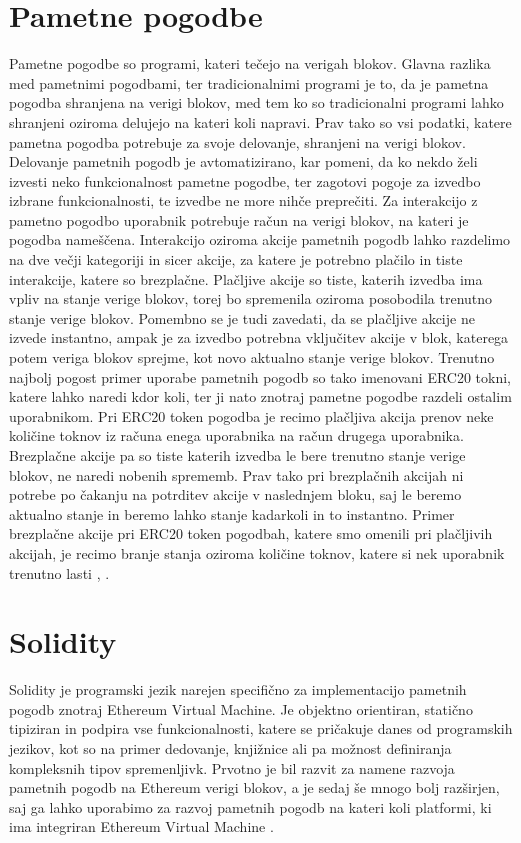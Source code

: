 \documentclass[a4paper,12pt,openright]{book}
\begin{document}
\section{Pametne pogodbe}
Pametne pogodbe so programi, kateri tečejo na verigah blokov.
Glavna razlika med pametnimi pogodbami, ter tradicionalnimi programi je to, da je pametna pogodba shranjena na verigi blokov, med tem ko so tradicionalni programi lahko shranjeni oziroma delujejo na kateri koli napravi.
Prav tako so vsi podatki, katere pametna pogodba potrebuje za svoje delovanje, shranjeni na verigi blokov.
Delovanje pametnih pogodb je avtomatizirano, kar pomeni, da ko nekdo želi izvesti neko funkcionalnost pametne pogodbe, ter zagotovi pogoje za izvedbo izbrane funkcionalnosti, te izvedbe ne more nihče preprečiti.
Za interakcijo z pametno pogodbo uporabnik potrebuje račun na verigi blokov, na kateri je pogodba nameščena.
Interakcijo oziroma akcije pametnih pogodb lahko razdelimo na dve večji kategoriji in sicer akcije, za katere je potrebno plačilo in tiste interakcije, katere so brezplačne.
Plačljive akcije so tiste, katerih izvedba ima vpliv na stanje verige blokov, torej bo spremenila oziroma posobodila trenutno stanje verige blokov.
Pomembno se je tudi zavedati, da se plačljive akcije ne izvede instantno, ampak je za izvedbo potrebna vključitev akcije v blok, katerega potem veriga blokov sprejme, kot novo aktualno stanje verige blokov.
Trenutno najbolj pogost primer uporabe pametnih pogodb so tako imenovani ERC20 tokni, katere lahko naredi kdor koli, ter ji nato znotraj pametne pogodbe razdeli ostalim uporabnikom. Pri ERC20 token pogodba je recimo plačljiva akcija prenov neke količine toknov iz računa enega uporabnika na račun drugega uporabnika.
Brezplačne akcije pa so tiste katerih izvedba le bere trenutno stanje verige blokov, ne naredi nobenih sprememb.
Prav tako pri brezplačnih akcijah ni potrebe po čakanju na potrditev akcije v naslednjem bloku, saj le beremo aktualno stanje in beremo lahko stanje kadarkoli in to instantno.
Primer brezplačne akcije pri ERC20 token pogodbah, katere smo omenili pri plačljivih akcijah, je recimo branje stanja oziroma količine toknov, katere si nek uporabnik trenutno lasti \cite{eth_smart_contract_intro}, \cite{erc20_token_standard}.

\section{Solidity}
Solidity je programski jezik narejen specifično za implementacijo pametnih pogodb znotraj Ethereum Virtual Machine.
Je objektno orientiran, statično tipiziran in podpira vse funkcionalnosti, katere se pričakuje danes od programskih jezikov,
kot so na primer dedovanje, knjižnice ali pa možnost definiranja kompleksnih tipov spremenljivk.
Prvotno je bil razvit za namene razvoja pametnih pogodb na Ethereum verigi blokov, a je sedaj še mnogo bolj razširjen,
saj ga lahko uporabimo za razvoj pametnih pogodb na kateri koli platformi, ki ima integriran Ethereum Virtual Machine \cite{solidity_docs}.
\end{document}
